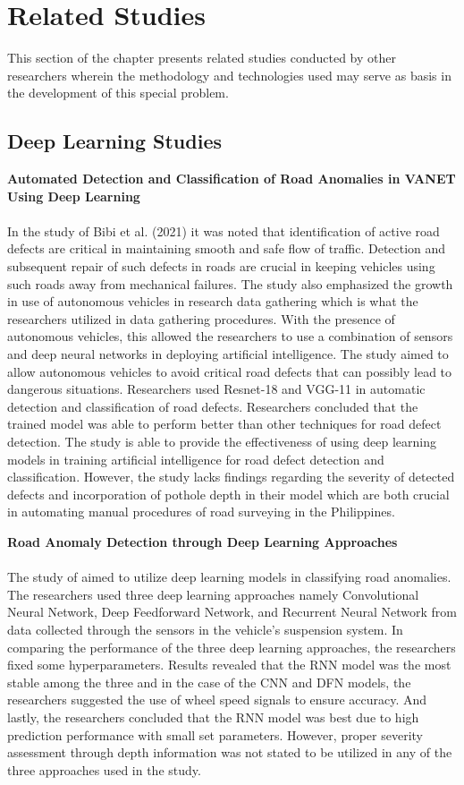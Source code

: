\section{Related Studies}
This section of the chapter presents related studies conducted by other researchers wherein the methodology and technologies used may serve as basis in the development of this special problem.

\subsection{Deep Learning Studies}

\noindent\textbf{\large Automated Detection and Classification of Road Anomalies in VANET Using Deep Learning} \\\\
In the study of Bibi et al. (2021) it was noted that identification of active road defects are critical in maintaining smooth and safe flow of traffic. Detection and subsequent repair of such defects in roads are crucial in keeping vehicles using such roads away from mechanical failures. The study also emphasized the growth in use of autonomous vehicles in research data gathering which is what the researchers utilized in data gathering procedures. With the presence of autonomous vehicles, this allowed the researchers to use a combination of sensors and deep neural networks in deploying artificial intelligence. The study aimed to allow autonomous vehicles to avoid critical road defects that can possibly lead to dangerous situations. Researchers used Resnet-18 and VGG-11 in automatic detection and classification of road defects. Researchers concluded that the trained model was able to perform better than other techniques for road defect detection. The study is able to provide the effectiveness of using deep learning models in training artificial intelligence for road defect detection and classification. However, the study lacks findings regarding the severity of detected defects and incorporation of pothole depth in their model which are both crucial in automating manual procedures of road surveying in the Philippines.


\noindent\textbf{\large Road Anomaly Detection through Deep Learning Approaches} \\\\
The study of  aimed to utilize deep learning models in classifying road anomalies. The researchers used three deep learning approaches namely Convolutional Neural Network, Deep Feedforward Network, and Recurrent Neural Network from data collected through the sensors in the vehicle's suspension system. In comparing the performance of the three deep learning approaches, the researchers fixed some hyperparameters. Results revealed that the RNN model was the most stable among the three and in the case of the CNN and DFN models, the researchers suggested the use of wheel speed signals to ensure accuracy. And lastly, the researchers concluded that the RNN model was best due to high prediction performance with small set parameters. However, proper severity assessment through depth information was not stated to be utilized in any of the three approaches used in the study.

